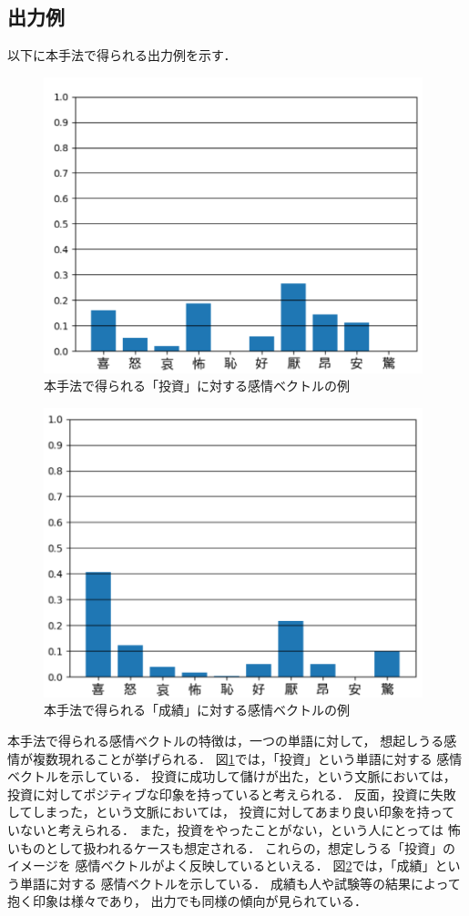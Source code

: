 	\subsection{出力例}
		以下に本手法で得られる出力例を示す．

		\begin{figure}[H]
			\centering
			\includegraphics[width=110mm]{./figure/takeuchi_output_toushi.png}
			\caption{本手法で得られる「投資」に対する感情ベクトルの例}
			\label{fig:takeuchi_output_1}
		\end{figure}

		\begin{figure}[H]
			\centering
			\includegraphics[width=110mm]{./figure/takeuchi_output_seiseki.png}
			\caption{本手法で得られる「成績」に対する感情ベクトルの例}
			\label{fig:takeuchi_output_2}
		\end{figure}

		本手法で得られる感情ベクトルの特徴は，一つの単語に対して，
		想起しうる感情が複数現れることが挙げられる．
		図\ref{fig:takeuchi_output_1}では，「投資」という単語に対する
		感情ベクトルを示している．
		投資に成功して儲けが出た，という文脈においては，
		投資に対してポジティブな印象を持っていると考えられる．
		反面，投資に失敗してしまった，という文脈においては，
		投資に対してあまり良い印象を持っていないと考えられる．
		また，投資をやったことがない，という人にとっては
		怖いものとして扱われるケースも想定される．
		これらの，想定しうる「投資」のイメージを
		感情ベクトルがよく反映しているといえる．
		図\ref{fig:takeuchi_output_2}では，「成績」という単語に対する
		感情ベクトルを示している．
		成績も人や試験等の結果によって抱く印象は様々であり，
		出力でも同様の傾向が見られている．

